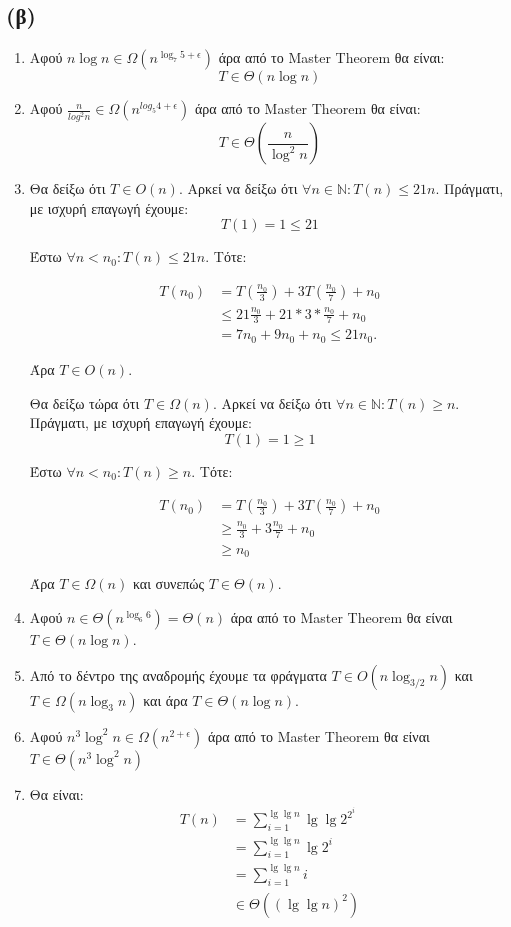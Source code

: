 \documentclass[11pt,a4paper]{book}
\begin{document}
\subsection*{(β)}

\begin{enumerate}
\item Αφού $n \log n \in \Omega( n^{\log_7 5 + \epsilon} )$ άρα από το \textlatin{Master Theorem} θα είναι: 
\[ T \in \Theta( n \log n )\]
\item Αφού $\frac{n}{log^2 n} \in \Omega( n^{log_5 4 + \epsilon} )$ άρα από το \textlatin{Master Theorem} θα είναι:
\[ T \in \Theta( \frac{n}{\log^2 n} ) \]
\item Θα δείξω ότι $T \in O( n )$. Αρκεί να δείξω ότι $\forall n \in \mathbb{N}: T( n ) \leq 21n$. Πράγματι, με ισχυρή επαγωγή έχουμε:
\[
T( 1 ) = 1 \leq 21
\]

Έστω $\forall n < n_0: T(n) \leq 21n$. Τότε:

\begin{align*}
T( n_0 ) &= T\left( \frac{n_0}{3} \right) + 3T\left( \frac{n_0}{7} \right) + n_0 \\
         &\leq 21 \frac{n_0}{3} + 21 * 3 * \frac{n_0}{7} + n_0 \\
         &= 7 n_0 + 9 n_0 + n_0 \leq 21 n_0.
\end{align*}

Άρα $T \in O( n )$.

Θα δείξω τώρα ότι $T \in \Omega( n )$. Αρκεί να δείξω ότι $\forall n \in \mathbb{N}: T( n ) \geq n$. Πράγματι, με ισχυρή επαγωγή έχουμε:
\[
T( 1 ) = 1 \geq 1
\]

Έστω $\forall n < n_0: T( n ) \geq n$. Τότε:

\begin{align*}
T( n_0 ) &= T\left( \frac{n_0}{3} \right) + 3T\left( \frac{n_0}{7} \right) + n_0\\
&\geq \frac{n_0}{3} + 3 \frac{n_0}{7} + n_0\\
&\geq n_0
\end{align*}

Άρα $T \in \Omega( n )$ και συνεπώς $T \in \Theta( n )$.

\item Αφού $n \in \Theta( n^{\log_6 6} ) = \Theta( n )$ άρα από το \textlatin{Master Theorem} θα είναι $T \in \Theta( n \log n )$.
\item Από το δέντρο της αναδρομής έχουμε τα φράγματα $T \in O( n \log_{3/2}n )$ και $T \in \Omega( n \log_3 n )$ και άρα $T \in \Theta( n \log n )$.
\item Αφού $n^3 \log^2 n \in \Omega( n^{2 + \epsilon} ) $ άρα από το \textlatin{Master Theorem} θα είναι $T \in \Theta( n^3 \log^2 n )$ 
\item Θα είναι:
\begin{align*}
T( n ) &= \sum_{i=1}^{\lg\lg n} \lg\lg 2^{2^i}\\
       &= \sum_{i=1}^{\lg\lg n} \lg 2^i\\
       &= \sum_{i=1}^{\lg\lg n} i\\
       &\in \Theta( ( \lg\lg n )^2 )\\
\end{align*}
       

\end{enumerate}
\end{document}
